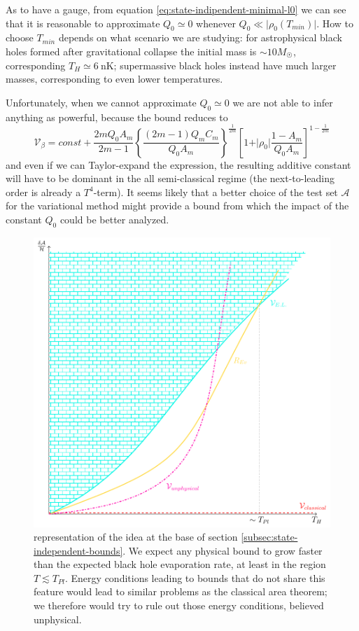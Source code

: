 As to have a gauge, from equation \eqref{eq:state-indipendent-minimal-l0} we can see that it is reasonable to approximate \(Q_0\simeq 0\) whenever \(Q_0 \ll \vert\rho_0(T_{min})\vert\). How to choose \(T_{min}\) depends on what scenario we are studying: for astrophysical black holes formed after gravitational collapse the initial mass is \(\sim 10 M_{\astrosun}\), corresponding \(T_H \simeq \SI{6}{\nano\kelvin}\); supermassive black holes instead have much larger masses, corresponding to even lower temperatures.

Unfortunately, when we cannot approximate \(Q_0 \simeq 0\) we are not able to infer anything as powerful, because the bound reduces to 
\begin{equation}
	\label{eq:state-independent-bound}
	\mathcal{V}_{\beta} = const + \frac{2mQ_0A_m}{2m - 1} \left\{\frac{(2m - 1)Q_mC_m}{Q_0A_m}\right\}^{\frac{1}{2m}} \left[1 + \vert\rho_0\vert\frac{1-A_m}{Q_0A_m}\right]^{1-\frac{1}{2m}}
\end{equation}
and even if we can Taylor-expand the expression, the resulting additive constant will have to be dominant in the all semi-classical regime (the next-to-leading order is already a \(T^4\)-term). It seems likely that a better choice of the test set \(\mathcal{A}\) for the variational method might provide a bound from which the impact of the constant \(Q_0\) could be better analyzed.	

\begin{figure}
	\centering
	\includegraphics[scale=0.77]{Immagini/state-independent-bounds/state-independent-bounds.pdf}
	\caption[]{representation of the idea at the base of section \ref{subsec:state-independent-bounds}. We expect any physical bound to grow faster than the expected black hole evaporation rate, at least in the region \(T \lesssim T_{Pl}\). Energy conditions leading to bounds that do not share this feature would lead to similar problems as the classical area theorem; we therefore would try to rule out those energy conditions, believed unphysical.}
	\label{fig:state-independent-bounds}
\end{figure}

